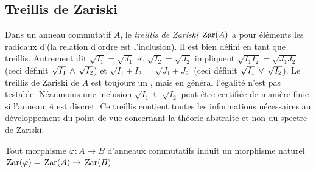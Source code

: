 \subsection{Treillis de Zariski}
\label{subsubsecZar}
Dans un anneau commutatif $A$, le {\em treillis de Zariski} $\,{\rm Zar}(A)$ a 
pour
éléments les radicaux d'\itfs (la relation d'ordre est l'inclusion).
Il est bien défini en tant que treillis.
Autrement dit $\sqrt{I_1}=\sqrt{J_1}$ et $\sqrt{I_2}=\sqrt{J_2}$
impliquent
$\sqrt{I_1I_2}= \sqrt{J_1J_2} $
(ceci définit $\sqrt{I_1}\,\wedge\,\sqrt{I_2}$) et
$\sqrt{I_1+I_2}=\sqrt{J_1+J_2}$
(ceci définit $\sqrt{I_1}\,\vee\,\sqrt{I_2}$). Le treillis de Zariski de
$A$
est toujours un \trdi, mais en général l'égalité n'est pas
testable. Néanmoins une inclusion $\sqrt{I_1}\subseteq \sqrt{I_2}$ peut
être certifiée de manière finie si l'anneau $A$ est discret.
Ce treillis contient toutes les informations nécessaires au
développement du point de vue \cof concernant la théorie abstraite
et non \cov du spectre de Zariski.

Tout morphisme $\varphi:A\to B$ d'anneaux commutatifs induit un morphisme naturel $\,{\rm Zar}(\varphi)=\,{\rm Zar}(A)\to\,{\rm Zar}(B)$. 

